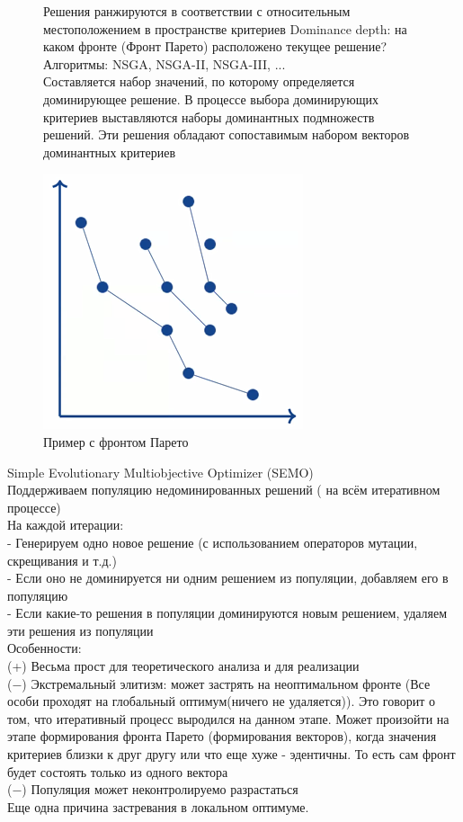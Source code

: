 \begin{figure}[!ht]
Решения ранжируются в соответствии с относительным местоположением в
пространстве критериев
Dominance depth: на каком фронте (Фронт Парето) расположено текущее решение?
Алгоритмы: NSGA, NSGA-II, NSGA-III, ...\\

Составляется набор значений, по которому определяется доминирующее решение. В процессе выбора доминирующих критериев выставляются наборы доминантных подмножеств решений. Эти решения обладают сопоставимым набором векторов доминантных критериев
\begin{center}
    \includegraphics[width=0.8\linewidth]{images/Dominate_3.PNG}
    \caption{Пример с фронтом Парето}
    \label{fig:mpr}
\end{center}
\end{figure}

\newpage
Simple Evolutionary Multiobjective Optimizer (SEMO)\\
Поддерживаем популяцию недоминированных решений ( на всём итеративном процессе)\\
На каждой итерации:\\
- Генерируем одно новое решение (с использованием операторов
мутации, скрещивания и т.д.)\\
- Если оно не доминируется ни одним решением из популяции,
добавляем его в популяцию\\
- Если какие-то решения в популяции доминируются новым решением,
удаляем эти решения из популяции\\

Особенности:\\
(+) Весьма прост для теоретического анализа и для реализации\\
(−) Экстремальный элитизм: может застрять на неоптимальном фронте (Все особи проходят на глобальный оптимум(ничего не удаляется)). Это говорит о том, что итеративный процесс выродился на данном этапе. Может произойти на этапе формирования фронта Парето (формирования векторов), когда значения критериев близки к друг другу или что еще хуже - эдентичны. То есть сам фронт будет состоять только из одного вектора\\
(−) Популяция может неконтролируемо разрастаться\\
Еще одна причина застревания в локальном оптимуме.
